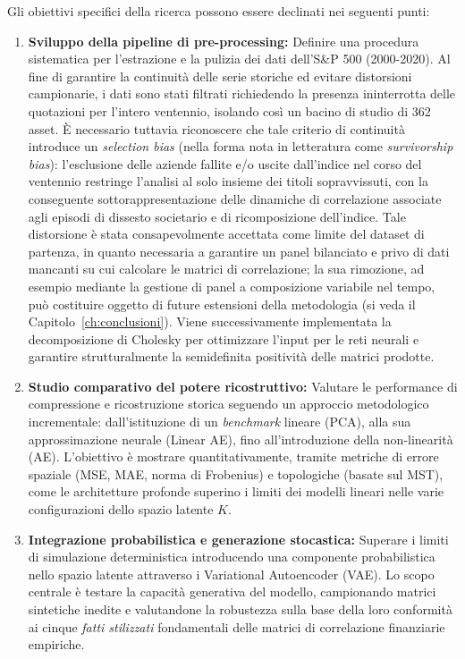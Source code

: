 Gli obiettivi specifici della ricerca possono essere declinati nei seguenti punti:
\begin{enumerate}
    \item \textbf{Sviluppo della pipeline di pre-processing:} Definire una procedura sistematica per l'estrazione e la pulizia dei dati dell'S\&P 500 (2000-2020). Al fine di garantire la continuità delle serie storiche ed evitare distorsioni campionarie, i dati sono stati filtrati richiedendo la presenza ininterrotta delle quotazioni per l'intero ventennio, isolando così un bacino di studio di 362 asset. È necessario tuttavia riconoscere che tale criterio di continuità introduce un \emph{selection bias} (nella forma nota in letteratura come \emph{survivorship bias}): l'esclusione delle aziende fallite e/o uscite dall'indice nel corso del ventennio restringe l'analisi al solo insieme dei titoli sopravvissuti, con la conseguente sottorappresentazione delle dinamiche di correlazione associate agli episodi di dissesto societario e di ricomposizione dell'indice. Tale distorsione è stata consapevolmente accettata come limite del dataset di partenza, in quanto necessaria a garantire un panel bilanciato e privo di dati mancanti su cui calcolare le matrici di correlazione; la sua rimozione, ad esempio mediante la gestione di panel a composizione variabile nel tempo, può costituire oggetto di future estensioni della metodologia (si veda il Capitolo~\ref{ch:conclusioni}). Viene successivamente implementata la decomposizione di Cholesky per ottimizzare l'input per le reti neurali e garantire strutturalmente la semidefinita positività delle matrici prodotte.
    
    \item \textbf{Studio comparativo del potere ricostruttivo:} Valutare le performance di compressione e ricostruzione storica seguendo un approccio metodologico incrementale: dall'istituzione di un \emph{benchmark} lineare (PCA), alla sua approssimazione neurale (Linear AE), fino all'introduzione della non-linearità (AE). L'obiettivo è mostrare quantitativamente, tramite metriche di errore spaziale (MSE, MAE, norma di Frobenius) e topologiche (basate sul MST), come le architetture profonde superino i limiti dei modelli lineari nelle varie configurazioni dello spazio latente $K$.
    
    \item \textbf{Integrazione probabilistica e generazione stocastica:} Superare i limiti di simulazione deterministica introducendo una componente probabilistica nello spazio latente attraverso i Variational Autoencoder (VAE). Lo scopo centrale è testare la capacità generativa del modello, campionando matrici sintetiche inedite e valutandone la robustezza sulla base della loro conformità ai cinque \emph{fatti stilizzati} fondamentali delle matrici di correlazione finanziarie empiriche.
\end{enumerate}